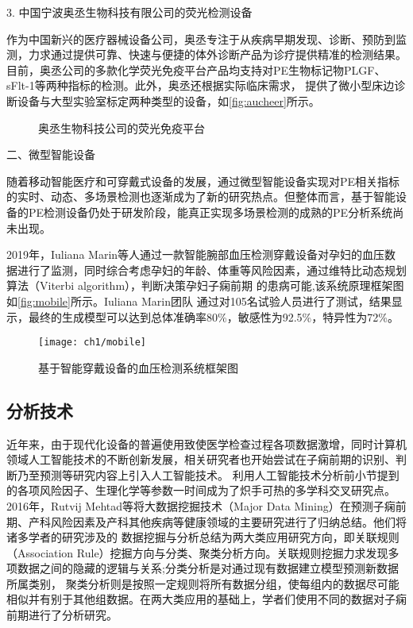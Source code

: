 3. 中国宁波奥丞生物科技有限公司的荧光检测设备

作为中国新兴的医疗器械设备公司，奥丞专注于从疾病早期发现、诊断、预防到监测，力求通过提供可靠、快速与便捷的体外诊断产品为诊疗提供精准的检测结果。
目前，奥丞公司的多款化学荧光免疫平台产品均支持对PE生物标记物PLGF、sFlt-1等两种指标的检测\cite{aucheer2021}。此外，奥丞还根据实际临床需求，
提供了微小型床边诊断设备与大型实验室标定两种类型的设备，如\autoref{fig:aucheer}所示。
\begin{figure}[h]
    \centering
    \quad
    \caption{\label{fig:aucheer}奥丞生物科技公司的荧光免疫平台}
\end{figure}


二、微型智能设备

随着移动智能医疗和可穿戴式设备的发展，通过微型智能设备实现对PE相关指标的实时、动态、多场景检测也逐渐成为了新的研究热点。但整体而言，基于智能设备的PE检测设备仍处于研发阶段，能真正实现多场景检测的成熟的PE分析系统尚未出现。
% 

2019年，Iuliana Marin等人\cite{Marin2019,Marin2020}通过一款智能腕部血压检测穿戴设备对孕妇的血压数据进行了监测，同时综合考虑孕妇的年龄、体重等风险因素，通过维特比动态规划算法（Viterbi algorithm），判断决策孕妇子痫前期
的患病可能,该系统原理框架图如\autoref{fig:mobile}所示。Iuliana Marin团队
通过对105名试验人员进行了测试，结果显示，最终的生成模型可以达到总体准确率80\%，敏感性为92.5\%，特异性为72\%\cite{Marin2019}。
\begin{figure}[htbp]
    \centering
    \texttt{[image: ch1/mobile]}
    \caption{\label{fig:mobile}基于智能穿戴设备的血压检测系统框架图}
\end{figure}

\subsection{分析技术}
近年来，由于现代化设备的普遍使用致使医学检查过程各项数据激增，同时计算机领域人工智能技术的不断创新发展，相关研究者也开始尝试在子痫前期的识别、判断乃至预测等研究内容上引入人工智能技术。
利用人工智能技术分析前小节提到的各项风险因子、生理化学等参数一时间成为了炽手可热的多学科交叉研究点。
2016年，Rutvij Mehtad等\cite{Mehta2016}将大数据挖掘技术（Major Data Mining）在预测子痫前期、产科风险因素及产科其他疾病等健康领域的主要研究进行了归纳总结。他们将诸多学者的研究涉及的
数据挖掘与分析总结为两大类应用研究方向，即关联规则（Association Rule）挖掘方向与分类、聚类分析方向。关联规则挖掘力求发现多项数据之间的隐藏的逻辑与关系;分类分析是对通过现有数据建立模型预测新数据所属类别，
聚类分析则是按照一定规则将所有数据分组，使每组内的数据尽可能相似并有别于其他组数据\cite{Han2006}。在两大类应用的基础上，学者们使用不同的数据对子痫前期进行了分析研究。

